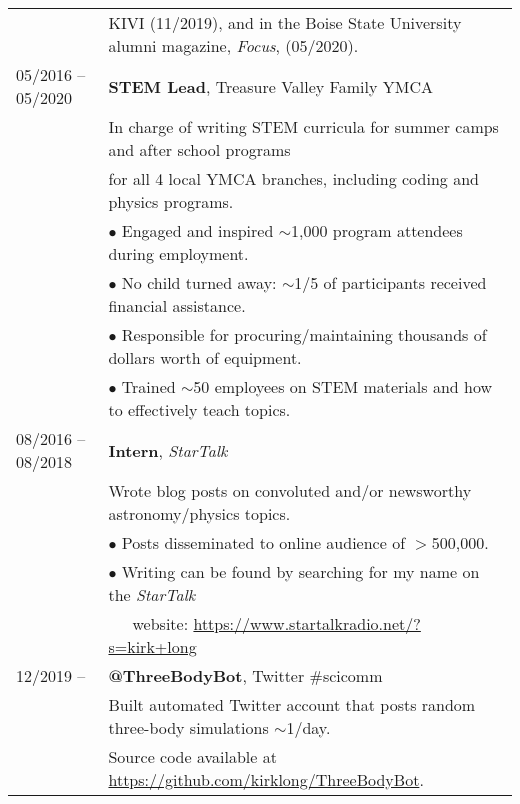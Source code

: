 \documentclass[11pt]{article}
\begin{document}
\begin{tabular}{ll}
      & KIVI (11/2019), and in the Boise State University alumni magazine, \textit{Focus}, (05/2020). \vspace{2mm} \\
05/2016 -- 05/2020   &   \textbf{STEM Lead}, Treasure Valley Family YMCA \vspace{1mm} \\
      & In charge of writing STEM curricula for summer camps and after school programs \\
      & for all 4 local YMCA branches, including coding and physics programs. \vspace{0.5mm}\\
      & $\bullet$ Engaged and inspired $\sim$1,000 program attendees during employment. \\
      & $\bullet$ No child turned away: $\sim$1/5 of participants received financial assistance. \\
      & $\bullet$ Responsible for procuring/maintaining thousands of dollars worth of equipment. \\
      & $\bullet$ Trained $\sim$50 employees on STEM materials and how to effectively teach topics. \vspace{2mm} \\
08/2016 -- 08/2018    &   \textbf{Intern}, \textit{StarTalk} \vspace{1mm} \\
      & Wrote blog posts on convoluted and/or newsworthy astronomy/physics topics. \\
      & $\bullet$ Posts disseminated to online audience of $>$500,000. \\
      & $\bullet$ Writing can be found by searching for my name on the \textit{StarTalk} \\
      & \-\ \-\ \-\ website: \url{https://www.startalkradio.net/?s=kirk+long} \vspace{2mm}\\
12/2019 --    &   \textbf{@ThreeBodyBot}, Twitter \#scicomm \vspace{1mm} \\
      & Built automated Twitter account that posts random three-body simulations $\sim$1/day. \\
      & Source code available at \url{https://github.com/kirklong/ThreeBodyBot}. \\
\end{tabular}
\end{document}
